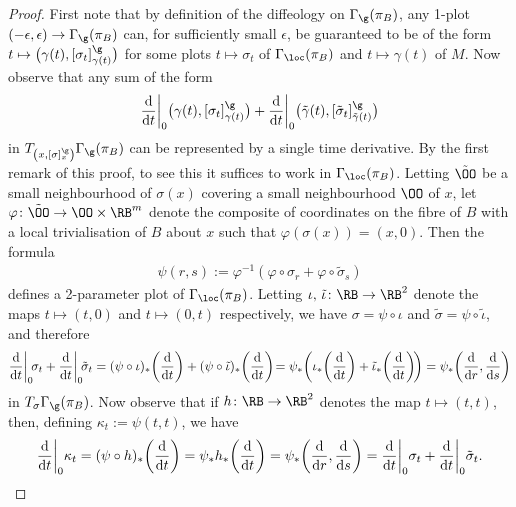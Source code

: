 \begin{proof}
First note that by definition of the diffeology on $\Gamma_{\g}(\pi_{B})$, any 1-plot $(-\epsilon,\epsilon)\rightarrow\Gamma_{\g}(\pi_{B})$ can, for sufficiently small $\epsilon$, be guaranteed to be of the form $t\mapsto \big(\gamma(t),[\sigma_{t}]^{\g}_{\gamma(t)}\big)$ for some plots $t\mapsto\sigma_{t}$ of $\Gamma_{\loc}(\pi_{B})$ and $t\mapsto\gamma(t)$ of $M$. Now observe that any sum of the form
\begin{gather*}
\frac{\rm d}{{\rm d}t}\bigg|_{0}\big(\gamma(t),[\sigma_{t}]^{\g}_{\gamma(t)}\big) +\frac{\rm d}{{\rm d}t}\bigg|_{0}\big(\tilde{\gamma}(t),[\tilde{\sigma}_{t}]^{\g}_{\tilde{\gamma}(t)}\big)
\end{gather*}
in $T_{\left(x,[\sigma]^{\g}_{x}\right)}\Gamma_{\g}(\pi_{B})$ can be represented by a single time derivative. By the first remark of this proof, to see this it suffices to work in $\Gamma_{\loc}(\pi_{B})$. Letting $\tilde{\OO}$ be a small neighbourhood of $\sigma(x)$ covering a small neighbourhood $\OO$ of $x$, let $\varphi\colon \tilde{\OO}\rightarrow\OO\times\RB^{m}$ denote the composite of coordinates on the fibre of $B$ with a local trivialisation of $B$ about $x$ such that $\varphi(\sigma(x)) = (x,0)$. Then the formula
\begin{gather*}%
\psi(r,s):=\varphi^{-1}(\varphi\circ\sigma_{r}+\varphi\circ\tilde{\sigma}_{s})
\end{gather*}
defines a 2-parameter plot of $\Gamma_{\loc}(\pi_{B})$. Letting $\iota,\,\tilde{\iota}\colon \RB\rightarrow\RB^{2}$ denote the maps $t\mapsto(t,0)$ and $t\mapsto(0,t)$ respectively, we have $\sigma = \psi\circ\iota$ and $\tilde{\sigma} =\psi\circ\tilde{\iota}$, and therefore
\begin{gather*}
\frac{\rm d}{{\rm d}t}\bigg|_{0}\!\sigma_{t}+\frac{\rm d}{{\rm d}t}\bigg|_{0}\!\tilde{\sigma}_{t} =(\psi\circ\iota)_{*}\bigg(\frac{\rm d}{{\rm d}t}\bigg)+(\psi\circ\tilde{\iota})_{*}\bigg(\frac{\rm d}{{\rm d}t}\bigg)\! = \psi_{*}\bigg(\iota_{*}\bigg(\frac{\rm d}{{\rm d}t}\bigg)+\tilde{\iota}_{*}\bigg(\frac{\rm d}{{\rm d}t}\bigg)\!\bigg) = \psi_{*}\bigg(\frac{\rm d}{{\rm d}r},\frac{\rm d}{{\rm d}s}\bigg)
\end{gather*}
in $T_{\sigma}\Gamma_{\g}(\pi_{B})$. Now observe that if $h\colon \RB\rightarrow\RB^{2}$ denotes the map $t\mapsto(t,t)$, then, defining $\kappa_{t}:=\psi(t,t)$, we have
\begin{gather*}
\frac{\rm d}{{\rm d}t}\bigg|_{0}\kappa_{t} = (\psi\circ h)_{*}\bigg(\frac{\rm d}{{\rm d}t}\bigg) = \psi_{*}h_{*}\bigg(\frac{\rm d}{{\rm d}t}\bigg) = \psi_{*}\bigg(\frac{\rm d}{{\rm d}r},\frac{\rm d}{{\rm d}s}\bigg) = \frac{\rm d}{{\rm d}t}\bigg|_{0}\sigma_{t}+\frac{\rm d}{{\rm d}t}\bigg|_{0}\tilde{\sigma}_{t}.

\end{gather*}
\end{proof}
